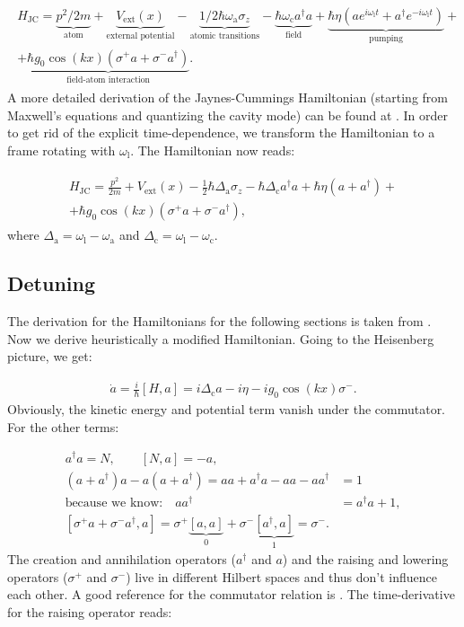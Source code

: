 \begin{align}
\begin{split}
H_\text{JC} = \underbrace{p^2 / 2m}_\text{atom} + \underbrace{V_\text{ext}(x)}_\text{external potential} - \underbrace{1/2 \hbar \omega_\text{a} \sigma_z}_\text{atomic transitions} - \underbrace{\hbar \omega_\text{c} a^\dagger a}_\text{field} + \underbrace{\hbar \eta (a e^{i \omega_\text{l} t} + a^\dagger e^{-i \omega_\text{l} t})}_\text{pumping} + \\
+ \underbrace{\hbar g_0 \cos(kx) (\sigma^+ a + \sigma^- a^\dagger)}_\text{field-atom interaction}.
\end{split}
\end{align}A more detailed derivation of the Jaynes-Cummings Hamiltonian (starting from Maxwell's equations and quantizing the cavity mode) can be found at \cite{collapseandrevival}. In order to get rid of the explicit time-dependence, we transform the Hamiltonian to a frame rotating with $\omega_\text{l}$. The Hamiltonian now reads:

\begin{align}
\begin{split}
H_\text{JC} = \frac{p^2}{2m} + V_\text{ext}(x) - \frac{1}{2} \hbar \Delta_\text{a} \sigma_z - \hbar \Delta_\text{c} a^\dagger a + \hbar \eta (a + a^\dagger) + \\
+ \hbar g_0 \cos(kx) (\sigma^+ a + \sigma^- a^\dagger),
\end{split}
\end{align}where $\Delta_\text{a} = \omega_\text{l} - \omega_\text{a}$ and $\Delta_\text{c} = \omega_\text{l} - \omega_\text{c}$.

\subsection{Detuning}
The derivation for the Hamiltonians for the following sections is taken from \cite{donner}. Now we derive heuristically a modified Hamiltonian. Going to the Heisenberg picture, we get:

\begin{align}
\dot{a} = \frac{i}{\hbar} [H, a] = i \Delta_\text{c} a - i \eta -i g_0 \cos(kx) \sigma^-.
\label{a_dot}
\end{align}Obviously, the kinetic energy and potential term vanish under the commutator. For the other terms:

\begin{align}
a^\dagger a = N, \qquad [N, a] = -a, \\
(a + a^\dagger) a - a (a + a^\dagger) = aa + a^\dagger a - aa - aa^\dagger & = 1 \\
\text{because we know:} \quad aa^\dagger & = a^\dagger a + 1, \nonumber \\
[\sigma^+ a + \sigma^- a^\dagger, a] = \sigma^+ \underbrace{[a, a]}_{0} + \sigma^- \underbrace{[a^\dagger, a]}_{1} = \sigma^-.
\end{align}The creation and annihilation operators ($a^\dagger$ and $a$) and the raising and lowering operators ($\sigma^+$ and $\sigma^-$) live in different Hilbert spaces and thus don't influence each other. A good reference for the commutator relation is \cite{bertlmann}. The time-derivative for the raising operator reads:

